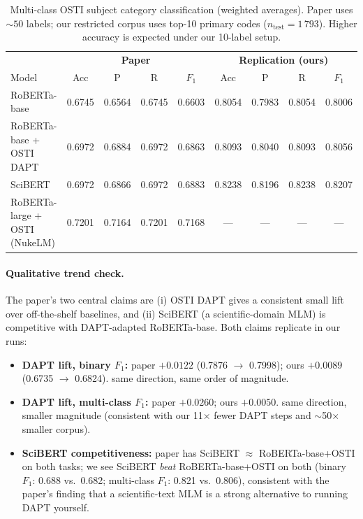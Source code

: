 \documentclass[11pt]{article}
\begin{document}
\begin{table}[h]
\centering
\caption{Multi-class OSTI subject category classification (weighted averages). Paper uses $\sim 50$ labels; our restricted corpus uses top-10 primary codes ($n_{\text{test}}=1\,793$). Higher accuracy is expected under our 10-label setup.}
\label{tab:mc}
\footnotesize
\begin{tabular}{lcccc|cccc}
\toprule
& \multicolumn{4}{c|}{\textbf{Paper}} & \multicolumn{4}{c}{\textbf{Replication (ours)}} \\
Model & Acc & P & R & $F_1$ & Acc & P & R & $F_1$ \\
\midrule
RoBERTa-base              & 0.6745 & 0.6564 & 0.6745 & 0.6603 & 0.8054 & 0.7983 & 0.8054 & 0.8006 \\
RoBERTa-base + OSTI DAPT  & 0.6972 & 0.6884 & 0.6972 & 0.6863 & 0.8093 & 0.8040 & 0.8093 & 0.8056 \\
SciBERT                   & 0.6972 & 0.6866 & 0.6972 & 0.6883 & 0.8238 & 0.8196 & 0.8238 & 0.8207 \\
RoBERTa-large + OSTI (NukeLM) & 0.7201 & 0.7164 & 0.7201 & 0.7168 & --- & --- & --- & --- \\
\bottomrule
\end{tabular}
\end{table}

\paragraph{Qualitative trend check.} The paper's two central claims are (i) OSTI DAPT gives a consistent small lift over off-the-shelf baselines, and (ii) SciBERT (a scientific-domain MLM) is competitive with DAPT-adapted RoBERTa-base. Both claims replicate in our runs:
\begin{itemize}
  \item \textbf{DAPT lift, binary $F_1$:} paper $+0.0122$ (0.7876 $\to$ 0.7998); ours $+0.0089$ (0.6735 $\to$ 0.6824). \checkmark same direction, same order of magnitude.
  \item \textbf{DAPT lift, multi-class $F_1$:} paper $+0.0260$; ours $+0.0050$. \checkmark same direction, smaller magnitude (consistent with our 11$\times$ fewer DAPT steps and $\sim$50$\times$ smaller corpus).
  \item \textbf{SciBERT competitiveness:} paper has SciBERT $\approx$ RoBERTa-base+OSTI on both tasks; we see SciBERT \emph{beat} RoBERTa-base+OSTI on both (binary $F_1$: 0.688 vs.\ 0.682; multi-class $F_1$: 0.821 vs.\ 0.806), consistent with the paper's finding that a scientific-text MLM is a strong alternative to running DAPT yourself.
\end{itemize}
\end{document}
